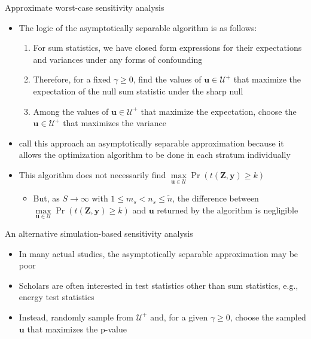\documentclass[table, xcolor={dvipsnames}, 9pt]{beamer}
\theoremstyle{newstyle}
\begin{document}
\begin{frame}{Approximate worst-case sensitivity analysis}
\begin{itemize}
\item The logic of the asymptotically separable algorithm \citep{gastwirthetal2000} is as follows:
\begin{enumerate}
\item \pause For sum statistics, we have closed form expressions for their expectations and variances under any forms of confounding
\item \pause Therefore, for a fixed $\gamma \geq 0$, find the values of $\mathbf{u} \in \mathcal{U}^+$ that maximize the expectation of the null sum statistic under the sharp null
\item \pause Among the values of $\mathbf{u} \in \mathcal{U}^+$ that maximize the expectation, choose the $\mathbf{u} \in \mathcal{U}^+$ that maximizes the variance
\end{enumerate}	
\item \pause \citet{gastwirthetal2000} call this approach an asymptotically separable approximation because it allows the optimization algorithm to be done in each stratum individually
\item \pause This algorithm does not necessarily find $\max \limits_{\mathbf{u} \in \mathcal{U}} \Pr\left(t\left(\mathbf{Z}, \mathbf{y}\right) \geq k \right)$
\begin{itemize}
\item \pause But, as $S \to \infty$ with $1 \leq m_s < n_s \leq \tilde{n}$, the difference between $\max \limits_{\mathbf{u} \in \mathcal{U}} \Pr\left(t\left(\mathbf{Z}, \mathbf{y}\right) \geq k \right)$ and $\mathbf{u}$ returned by the algorithm is negligible
\end{itemize}
\end{itemize}
\end{frame}
\begin{frame}{An alternative simulation-based sensitivity analysis}
\begin{itemize}
\item In many actual studies, the asymptotically separable approximation may be poor
\item \pause Scholars are often interested in test statistics other than sum statistics, e.g., energy test statistics \citep{szekelyrizzo2013,rizzoszekely2016,szekelyrizzo2017}
\item \pause Instead, randomly sample from $\mathcal{U}^+$ and, for a given $\gamma \geq 0$, choose the sampled $\mathbf{u}$ that maximizes the p-value
\end{itemize}
\end{frame}
\end{document}
